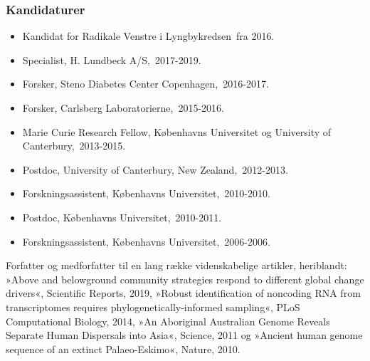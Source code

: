 \documentclass[11pt, a4paper]{awesome-cv}
\begin{document}
\begin{cvletter}
\subsubsection*{Kandidaturer}
\begin{itemize}
\item Kandidat for Radikale Venstre i Lyngbykredsen fra 2016.
\end{itemize}
\begin{itemize}
\item Specialist, H. Lundbeck A/S, 2017-2019.
\item Forsker, Steno Diabetes Center Copenhagen, 2016-2017.
\item Forsker, Carlsberg Laboratorierne, 2015-2016.
\item Marie Curie Research Fellow, Københavns Universitet og University of Canterbury, 2013-2015.
\item Postdoc, University of Canterbury, New Zealand, 2012-2013.
\item Forskningsassistent, Københavns Universitet, 2010-2010.
\item Postdoc, Københavns Universitet, 2010-2011.
\item Forskningsassistent, Københavns Universitet, 2006-2006.
\end{itemize}
Forfatter og medforfatter til en lang række videnskabelige artikler, heriblandt: »Above and belowground community strategies respond to different global change drivers«, Scientific Reports, 2019, »Robust identification of noncoding RNA from transcriptomes requires phylogenetically-informed sampling«, PLoS Computational Biology, 2014, »An Aboriginal Australian Genome Reveals Separate Human Dispersals into Asia«, Science, 2011 og »Ancient human genome sequence of an extinct Palaeo-Eskimo«, Nature, 2010. 

\end{cvletter}
\end{document}
